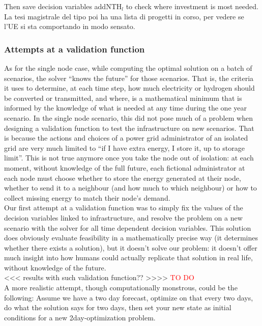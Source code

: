 \documentclass[english]{article}
\numberwithin{definition}{section}
\numberwithin{theorem}{section}
\numberwithin{problem}{section}
\begin{document}
Then save decision variables addNTH$_l$ to check where investment is most needed. La tesi magistrale del tipo poi ha una lista di progetti in corso, per vedere se l'UE si sta comportando in modo sensato.

\subsubsection{Attempts at a validation function}
As for the single node case, while computing the optimal solution on a batch of scenarios, the solver ``knows the future'' for those scenarios. That is, the criteria it uses to determine, at each time step, how much electricity or hydrogen should be converted or transmitted, and where, is a mathematical minimum that is informed by the knowledge of what is needed at any time during the one year scenario. In the single node scenario, this did not pose much of a problem when designing a validation function to test the infrastructure on new scenarios. That is because the actions and choices of a power grid administrator of an isolated grid are very much limited to ``if I have extra energy, I store it, up to storage limit''. This is not true anymore once you take the node out of isolation: at each moment, without knowledge of the full future, each fictional administrator at each node must choose whether to store the energy generated at their node, whether to send it to a neighbour (and how much to which neighbour) or how to collect missing energy to match their node's demand.\\


Our first attempt at a validation function was to simply fix the values of the decision variables linked to infrastructure, and resolve the problem on a new scenario with the solver for all time dependent decision variables. This solution does obviously evaluate feasibility in a mathematically precise way (it determines whether there exists a solution), but it doesn't solve our problem: it doesn't offer much insight into how humans could actually replicate that solution in real life, without knowledge of the future.\\

<<< results with such validation function?? >>>> \textcolor{red}{TO DO}\\

A more realistic attempt, though computationally monstrous, could be the following:
Assume we have a two day forecast, optimize on that every two days, do what the solution says for two days, then set your new state as initial conditions for a new 2day-optimization problem.\\
\end{document}
